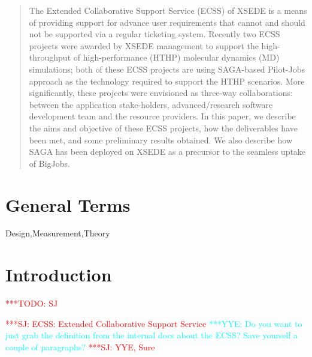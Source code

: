 \documentclass{sig-alternate}
\begin{document}
\begin{abstract}
The Extended Collaborative Support Service (ECSS) of XSEDE is a means
of providing support for advance user requirements that cannot and
should not be supported via a regular ticketing system. Recently two
ECSS projects were awarded by XSEDE management to support the
high-throughput of high-performance (HTHP) molecular dynamics (MD)
simulations; both of these ECSS projects are using SAGA-based
Pilot-Jobs approach as the technology required to support the HTHP
scenarios.  More significantly, these projects were envisioned as
three-way collaborations: between the application stake-holders,
advanced/research software development team and the resource
providers. In this paper, we describe the aims and objective of these
ECSS projects, how the deliverables have been met, and some
preliminary results obtained. We also describe how SAGA has been
deployed on XSEDE as a precursor to the seamless uptake of BigJobs.
\end{abstract}


\newif\ifdraft \drafttrue \ifdraft
\newcommand{\mrnote}[1]{{\textcolor{green} { ***MR: #1 }}}
\newcommand{\jhanote}[1]{ {\textcolor{red} { ***SJ: #1 }}}
\newcommand{\yyenote}[1]{ {\textcolor{cyan} { ***YYE: #1 }}}
\newcommand{\pmnote}[1]{ {\textcolor{blue} { ***PM: #1 }}}
\newcommand{\todo}[1]{ {\textcolor{red} { ***TODO: #1 }}}
\newcommand{\fix}[1]{ {\textcolor{red} { ***FIX: #1 }}}
\newcommand{\reviewer}[1]{} \else \newcommand{\yyenote}[1]{}
\newcommand{\mrmnote}[1]{} \newcommand{\pmnote}[1]{}
\newcommand{\jhanote}[1]{} \newcommand{\todo}[1]{ {\textcolor{red} {
      ***TODO: #1 }}} \newcommand{\fix}[1]{} \fi




\section*{General Terms}{Design,Measurement,Theory}

 \keywords{}

\section{Introduction} \todo{SJ}

\jhanote{ECSS: Extended Collaborative Support Service } \yyenote{Do
  you want to just grab the definition from the internal docs about
  the ECSS? Save yourself a couple of paragraphs?}\jhanote{YYE, Sure}
\end{document}
